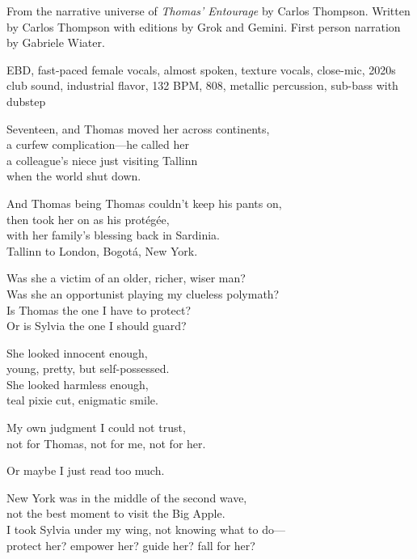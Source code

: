 
\begin{notes}
From the narrative universe of \emph{Thomas’ Entourage} by Carlos Thompson. %
Written by Carlos Thompson with editions by Grok and Gemini. %
First person narration by Gabriele Wiater.
\end{notes}
\begin{style}
EBD, fast-paced female vocals, almost spoken, texture vocals, close-mic, 2020s club sound, industrial flavor, 132 BPM, 808, metallic percussion, sub-bass with dubstep
\end{style}
\begin{lyrics}
Seventeen, and Thomas moved her across continents,\\
a curfew complication—he called her\\
a colleague's niece just visiting Tallinn\\
when the world shut down.

And Thomas being Thomas couldn't keep his pants on,\\
then took her on as his protégée,\\
with her family's blessing back in Sardinia.\\
Tallinn to London, Bogotá, New York.

Was she a victim of an older, richer, wiser man?\\
Was she an opportunist playing my clueless polymath?\\
Is Thomas the one I have to protect?\\
Or is Sylvia the one I should guard?

She looked innocent enough,\\
young, pretty, but self-possessed.\\
She looked harmless enough,\\
teal pixie cut, enigmatic smile.

My own judgment I could not trust,\\
not for Thomas, not for me, not for her.

Or maybe I just read too much.

New York was in the middle of the second wave,\\
not the best moment to visit the Big Apple.\\
I took Sylvia under my wing, not knowing what to do—\\
protect her? empower her? guide her? fall for her?


\end{lyrics}
